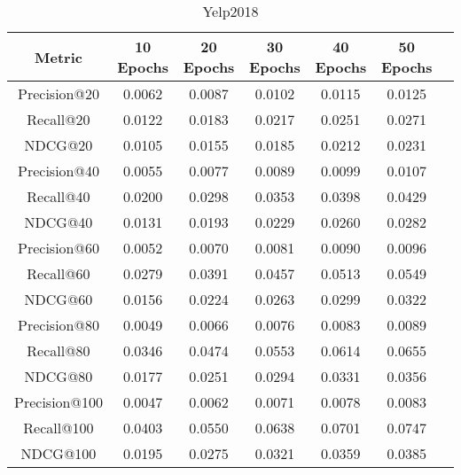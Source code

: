 \documentclass[a4paper]{LTJournalArticle}
\begin{document}
	\begin{table}[h]
		\centering
		\caption{Yelp2018}
		\label{tab:metrics_transposed}
		\scriptsize %
		\begin{tabular}{ccccccc}
			\toprule
			Metric & 10 Epochs & 20 Epochs & 30 Epochs & 40 Epochs & 50 Epochs \\
			\midrule
			Precision@20  & 0.0062  & 0.0087  & 0.0102  & 0.0115  & 0.0125  \\
			Recall@20     & 0.0122  & 0.0183  & 0.0217  & 0.0251  & 0.0271  \\
			NDCG@20       & 0.0105  & 0.0155  & 0.0185  & 0.0212  & 0.0231  \\
			Precision@40  & 0.0055  & 0.0077  & 0.0089  & 0.0099  & 0.0107  \\
			Recall@40     & 0.0200  & 0.0298  & 0.0353  & 0.0398  & 0.0429  \\
			NDCG@40       & 0.0131  & 0.0193  & 0.0229  & 0.0260  & 0.0282  \\
			Precision@60  & 0.0052  & 0.0070  & 0.0081  & 0.0090  & 0.0096  \\
			Recall@60     & 0.0279  & 0.0391  & 0.0457  & 0.0513  & 0.0549  \\
			NDCG@60       & 0.0156  & 0.0224  & 0.0263  & 0.0299  & 0.0322  \\
			Precision@80  & 0.0049  & 0.0066  & 0.0076  & 0.0083  & 0.0089  \\
			Recall@80     & 0.0346  & 0.0474  & 0.0553  & 0.0614  & 0.0655  \\
			NDCG@80       & 0.0177  & 0.0251  & 0.0294  & 0.0331  & 0.0356  \\
			Precision@100 & 0.0047  & 0.0062  & 0.0071  & 0.0078  & 0.0083  \\
			Recall@100    & 0.0403  & 0.0550  & 0.0638  & 0.0701  & 0.0747  \\
			NDCG@100      & 0.0195  & 0.0275  & 0.0321  & 0.0359  & 0.0385  \\
			\bottomrule
		\end{tabular}
	\end{table}
		
\end{document}
